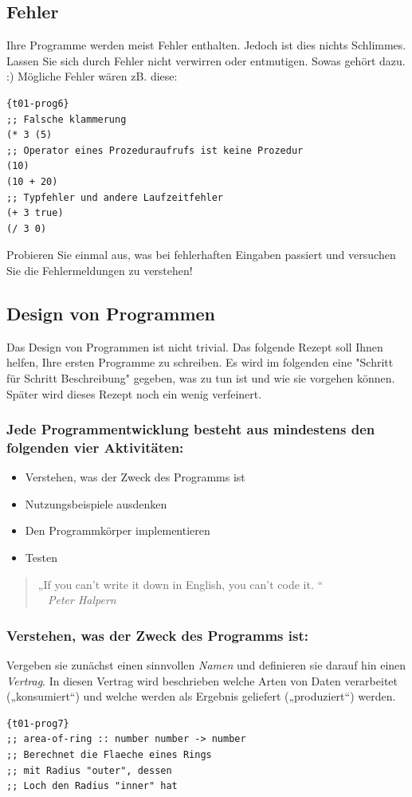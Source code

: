 \subsection{Fehler}
Ihre Programme werden meist Fehler enthalten. Jedoch ist dies nichts Schlimmes. Lassen Sie sich durch Fehler nicht verwirren oder entmutigen. Sowas gehört dazu. :)
Mögliche Fehler wären zB. diese:
\begin{lstlisting}{t01-prog6}
;; Falsche klammerung
(* 3 (5)
;; Operator eines Prozeduraufrufs ist keine Prozedur
(10)
(10 + 20)
;; Typfehler und andere Laufzeitfehler
(+ 3 true)
(/ 3 0)
\end{lstlisting}
Probieren Sie einmal aus, was bei fehlerhaften Eingaben passiert und versuchen Sie die Fehlermeldungen zu verstehen!

\subsection{Design von Programmen}
Das Design von Programmen ist nicht trivial. Das folgende Rezept soll Ihnen helfen, Ihre ersten Programme zu schreiben. Es wird im folgenden eine "Schritt für Schritt Beschreibung" gegeben, was zu tun ist und wie sie vorgehen können. Später wird dieses Rezept noch ein wenig verfeinert.

\subsubsection{Jede Programmentwicklung besteht aus
mindestens den folgenden vier Aktivitäten:}

\begin{itemize}
	\item Verstehen, was der Zweck des Programms ist
	\item Nutzungsbeispiele ausdenken
	\item Den Programmkörper implementieren
	\item Testen
\end{itemize}

\begin{quote}
	„If you can't write it down in English, you can't code it.	“ \\
	\textit{~ Peter Halpern}
\end{quote}

\subsubsection{Verstehen, was der Zweck des Programms ist:}
Vergeben sie zunächst einen sinnvollen \textit{Namen} und definieren sie darauf hin einen \textit{Vertrag}. In diesen Vertrag wird beschrieben welche Arten von Daten verarbeitet („konsumiert“) und welche werden als Ergebnis geliefert („produziert“) werden.
\begin{lstlisting}{t01-prog7}
;; area-of-ring :: number number -> number
;; Berechnet die Flaeche eines Rings
;; mit Radius "outer", dessen
;; Loch den Radius "inner" hat
\end{lstlisting}

